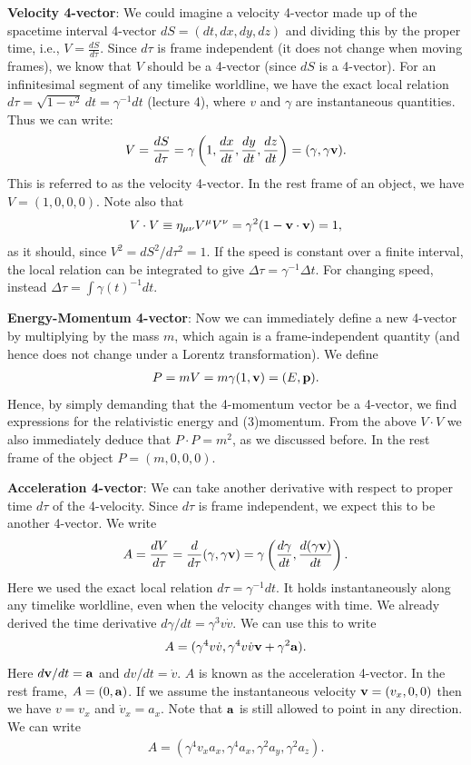 \documentclass[12pt]{article}
\newcommand{\be}{\begin{eqnarray}}
\newcommand{\ee}{\end{eqnarray}}
\begin{document}
\vspace{2em}

\noindent 
{\bf Velocity 4-vector}: We could imagine a velocity 4-vector made up of the spacetime interval 4-vector $dS = (dt, dx,dy,dz)$ and dividing this by the proper time, i.e., $V = \frac{dS}{d\tau}$.  Since $d\tau$ is frame independent (it does not change when moving frames), we know that $V$ should be a 4-vector (since $dS$ is a 4-vector). For an infinitesimal segment of any timelike worldline, we have the exact local relation $d\tau = \sqrt{1-v^2}\,dt = \gamma^{-1}dt$ (lecture 4), where $v$ and $\gamma$ are instantaneous quantities. Thus we can write:
\be
V = \frac{dS}{d\tau} = \gamma\left(1, \frac{dx}{dt}, \frac{dy}{dt}, \frac{dz}{dt}\right) = (\gamma, \gamma {\bf v}).
\ee
This is referred to as the velocity 4-vector. In the rest frame of an object, we have $V = (1,0,0,0)$. Note also that 
\be
V\cdot V \equiv \eta_{\mu \nu} V^{\mu} V^{\nu} = \gamma^2(1-{\bf v} \cdot {\bf v}) = 1, 
\ee
as it should, since $V^2 = dS^2/d\tau^2 = 1$. If the speed is constant over a finite interval, the local relation can be integrated to give $\Delta\tau=\gamma^{-1}\Delta t$. For changing speed, instead $\Delta\tau=\int \gamma(t)^{-1}dt$.

\vspace{2em}

\noindent 
{\bf Energy-Momentum 4-vector}: Now we can immediately define a new 4-vector by multiplying by the mass $m$, which again is a frame-independent quantity (and hence does not change under a Lorentz transformation). We define
\be
P = mV = m\gamma(1,{\bf v}) = (E, {\bf p}). 
\ee
Hence, by simply demanding that the 4-momentum vector be a 4-vector, we find expressions for the relativistic energy and (3)momentum. From the above $V\cdot V$ we also immediately deduce that $P\cdot P = m^2$, as we discussed before. In the rest frame of the object $P = (m,0,0,0)$. 


\vspace{2em}

\noindent 
{\bf Acceleration 4-vector}: We can take another derivative with respect to proper time $d\tau$ of the 4-velocity. Since $d\tau$ is frame independent, we expect this to be another 4-vector. We write 
\be
A = \frac{dV}{d\tau} = \frac{d}{d\tau}(\gamma, \gamma{\bf v}) = \gamma\left(\frac{d\gamma}{dt}, \frac{d(\gamma{\bf v})}{dt}\right).
\ee
Here we used the exact local relation $d\tau=\gamma^{-1}dt$. It holds instantaneously along any timelike worldline, even when the velocity changes with time. We already derived the time derivative $d\gamma/dt=\gamma^3v\dot v$. We can use this to write
\be
A = (\gamma^4 v \dot{v}, \gamma^4 v \dot{v} {\bf v}+ \gamma^2{\bf a}).
\ee
Here $d{\bf v}/dt = {\bf a}$ and $dv/dt = \dot{v}$. $A$ is known as the acceleration 4-vector. In the rest frame, $A = (0,{\bf a})$. If we assume the instantaneous velocity ${\bf v}  = (v_x,0,0)$ then we have $v = v_x$ and $\dot{v}_x = a_x$. Note that ${\bf a}$ is still allowed to point in any direction. We can write
\be
A = (\gamma^4 v_x a_x, \gamma^4 a_x, \gamma^2 a_y, \gamma^2 a_z).
\ee
\end{document}
